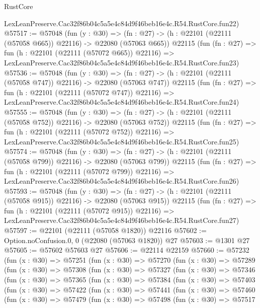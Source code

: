 \begin{lexlean}{RustCore}
\begin{coremodule}
    LexLeanPreserve.Cac32f86b04c5a5e4c84d9f46beb16e4c.R54.RustCore.fun22)
@57517 := @57048
    (fun (y : @30) =>
    (fn : @27) -> (h : @22101 (@22111 (@57058 @665)) @22116) -> @22080 (@57063 @665))
    @22115
    (fun (fn : @27) =>
    fun (h : @22101 (@22111 (@57072 @665)) @22116) =>
    LexLeanPreserve.Cac32f86b04c5a5e4c84d9f46beb16e4c.R54.RustCore.fun23)
@57536 := @57048
    (fun (y : @30) =>
    (fn : @27) -> (h : @22101 (@22111 (@57058 @747)) @22116) -> @22080 (@57063 @747))
    @22115
    (fun (fn : @27) =>
    fun (h : @22101 (@22111 (@57072 @747)) @22116) =>
    LexLeanPreserve.Cac32f86b04c5a5e4c84d9f46beb16e4c.R54.RustCore.fun24)
@57555 := @57048
    (fun (y : @30) =>
    (fn : @27) -> (h : @22101 (@22111 (@57058 @752)) @22116) -> @22080 (@57063 @752))
    @22115
    (fun (fn : @27) =>
    fun (h : @22101 (@22111 (@57072 @752)) @22116) =>
    LexLeanPreserve.Cac32f86b04c5a5e4c84d9f46beb16e4c.R54.RustCore.fun25)
@57574 := @57048
    (fun (y : @30) =>
    (fn : @27) -> (h : @22101 (@22111 (@57058 @799)) @22116) -> @22080 (@57063 @799))
    @22115
    (fun (fn : @27) =>
    fun (h : @22101 (@22111 (@57072 @799)) @22116) =>
    LexLeanPreserve.Cac32f86b04c5a5e4c84d9f46beb16e4c.R54.RustCore.fun26)
@57593 := @57048
    (fun (y : @30) =>
    (fn : @27) -> (h : @22101 (@22111 (@57058 @915)) @22116) -> @22080 (@57063 @915))
    @22115
    (fun (fn : @27) =>
    fun (h : @22101 (@22111 (@57072 @915)) @22116) =>
    LexLeanPreserve.Cac32f86b04c5a5e4c84d9f46beb16e4c.R54.RustCore.fun27)
@57597 := @22101 (@22111 (@57058 @1820)) @22116
@57602 := Option.noConfusion.{0, 0} (@22080 (@57063 @1820)) @27
@57603 := @1301 @27
@57605 := @57602 @57603 @27
@57606 := @22114 @22159
@57660 := @57232
    (fun (x : @30) =>
    @57251
      (fun (x : @30) =>
      @57270
        (fun (x : @30) =>
        @57289
          (fun (x : @30) =>
          @57308
            (fun (x : @30) =>
            @57327
              (fun (x : @30) =>
              @57346
                (fun (x : @30) =>
                @57365
                  (fun (x : @30) =>
                  @57384
                    (fun (x : @30) =>
                    @57403
                      (fun (x : @30) =>
                      @57422
                        (fun (x : @30) =>
                        @57441
                          (fun (x : @30) =>
                          @57460
                            (fun (x : @30) =>
                            @57479
                              (fun (x : @30) =>
                              @57498
                                (fun (x : @30) =>
                                @57517

\end{coremodule}
\end{lexlean}
